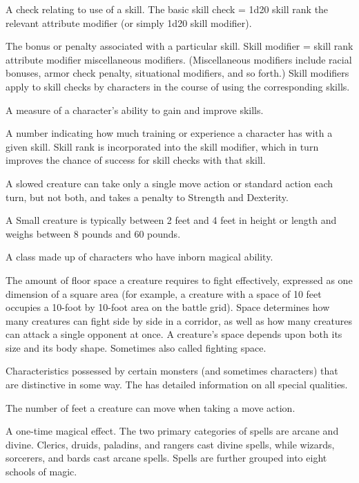  A check relating to use of a skill. The basic skill 
check = 1d20 \add skill rank \add the relevant attribute modifier (or simply 
1d20 \add skill modifier). 

 The bonus or penalty associated with a particular 
skill. Skill modifier = skill rank \add attribute modifier \add miscellaneous 
modifiers. (Miscellaneous modifiers include racial bonuses, armor 
check penalty, situational modifiers, and so forth.) Skill modifiers 
apply to skill checks by characters in the course of using the 
corresponding skills. 

 A measure of a character's ability to gain and 
improve skills.

 A number indicating how much training or experience a character has with a given skill. Skill rank is incorporated 
into the skill modifier, which in turn improves the chance of 
success for skill checks with that skill. 

 A slowed creature can take only a single move action or standard action each turn, but not both, and takes a  penalty to Strength and Dexterity.

 A Small creature is typically between 2 feet and 4 feet in 
height or length and weighs between 8 pounds and 60 pounds. 

 A class made up of characters who have inborn 
magical ability. 

 The amount of floor space a creature requires to fight 
effectively, expressed as one dimension of a square area (for 
example, a creature with a space of 10 feet occupies a 10-foot by 10-foot area on the battle grid). Space determines how many creatures 
can fight side by side in a corridor, as well as how many creatures 
can attack a single opponent at once. A creature's space depends 
upon both its size and its body shape. Sometimes also called fighting 
space. 

 Characteristics possessed by certain monsters 
(and sometimes characters) that are distinctive in some way. The 
 has detailed information on all special qualities. 

 The number of feet a creature can move when taking a 
move action. 

 A one-time magical effect. The two primary categories of 
spells are arcane and divine. Clerics, druids, paladins, and rangers 
cast divine spells, while wizards, sorcerers, and bards cast arcane 
spells. Spells are further grouped into eight schools of magic. 

